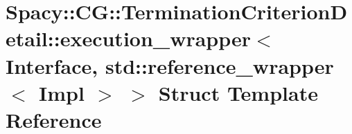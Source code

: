 \hypertarget{structSpacy_1_1CG_1_1TerminationCriterionDetail_1_1execution__wrapper_3_01Interface_00_01std_1_15f5761607441ed2de6db2283270121dc}{\section{\-Spacy\-:\-:\-C\-G\-:\-:\-Termination\-Criterion\-Detail\-:\-:execution\-\_\-wrapper$<$ \-Interface, std\-:\-:reference\-\_\-wrapper$<$ \-Impl $>$ $>$ \-Struct \-Template \-Reference}
\label{structSpacy_1_1CG_1_1TerminationCriterionDetail_1_1execution__wrapper_3_01Interface_00_01std_1_15f5761607441ed2de6db2283270121dc}
}
